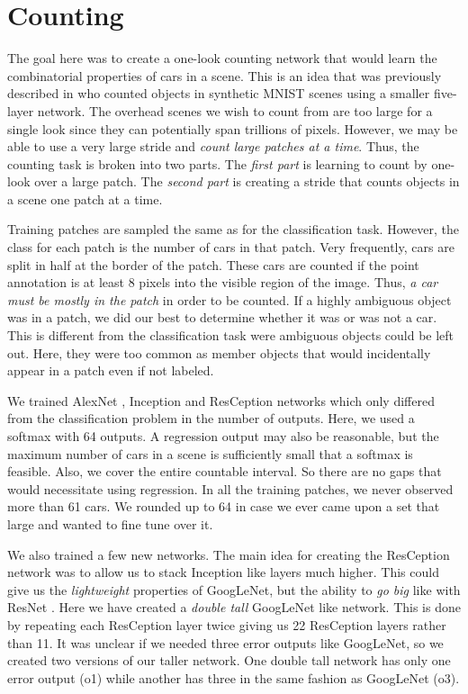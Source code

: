 \documentclass[runningheads]{llncs}
\begin{document}
\section{Counting}
The goal here was to create a one-look \cite{YOLO} counting network that would learn the combinatorial properties of cars in a scene. This is an idea that was previously described in \cite{Segui15} who counted objects in synthetic MNIST \cite{MNIST} scenes using a smaller five-layer network. The overhead scenes we wish to count from are too large for a single look since they can potentially span trillions of pixels. However, we may be able to use a very large stride and {\it count large patches at a time}.  Thus, the counting task is broken into two parts. The {\it first part} is learning to count by one-look over a large patch. The {\it second part} is creating a stride that counts objects in a scene one patch at a time. 

Training patches are sampled the same as for the classification task. However, the class for each patch is the number of cars in that patch. Very frequently, cars are split in half at the border of the patch. These cars are counted if the point annotation is at least 8 pixels into the visible region of the image. Thus, {\it a car must be mostly in the patch} in order to be counted. If a highly ambiguous object was in a patch, we did our best to determine whether it was or was not a car. This is different from the classification task were ambiguous objects could be left out. Here, they were too common as member objects that would incidentally appear in a patch even if not labeled. 

We trained AlexNet \cite{AlexNet}, Inception \cite{GoogLeNet,BatchNorm} and ResCeption networks which only differed from the classification problem in the number of outputs. Here, we used a softmax with 64 outputs. A regression output may also be reasonable, but the maximum number of cars in a scene is sufficiently small that a softmax is feasible. Also, we cover the entire countable interval. So there are no gaps that would necessitate using regression. In all the training patches, we never observed more than 61 cars. We rounded up to 64 in case we ever came upon a set that large and wanted to fine tune over it. 

We also trained a few new networks. The main idea for creating the ResCeption network was to allow us to stack Inception like layers much higher. This could give us the {\it lightweight} properties of GoogLeNet, but the ability to {\it go big} like with ResNet \cite{ResNet}. Here we have created a {\it double tall} GoogLeNet like network. This is done by repeating each ResCeption layer twice giving us 22 ResCeption layers rather than 11. It was unclear if we needed three error outputs like GoogLeNet, so we created two versions of our taller network. One double tall network has only one error output (o1) while another has three in the same fashion as GoogLeNet (o3). 
\end{document}
